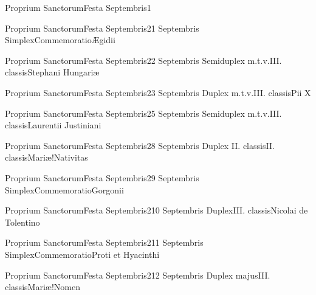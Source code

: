 \documentclass[liber-responsorialis_aestivus.tex]{subfiles}
\begin{document}
	{Proprium Sanctorum}{Festa Septembris}{1}{}
	{}{}{}{}{}

	{Proprium Sanctorum}{Festa Septembris}{2}{1 Septembris}
	{Simplex}{Commemoratio}{Ægidii}
	{}
	{}
\rubric{\respdetemp}

	{Proprium Sanctorum}{Festa Septembris}{2}{2 Septembris}
	{Semiduplex m.t.v.}{III. classis}{Stephani Hungariæ}
	{\conprubric}
	{\respdetemp}

	{Proprium Sanctorum}{Festa Septembris}{2}{3 Septembris}
	{Duplex m.t.v.}{III. classis}{Pii X}
	{\coporubric}
	{\respdetemp}

	{Proprium Sanctorum}{Festa Septembris}{2}{5 Septembris}
	{Semiduplex m.t.v.}{III. classis}{Laurentii Justiniani}
	{\coporubric}
	{\respdetemp}

	{Proprium Sanctorum}{Festa Septembris}{2}{8 Septembris}
	{Duplex II. classis}{II. classis}{Mariæ!Nativitas}
	{}
	{}

	{Proprium Sanctorum}{Festa Septembris}{2}{9 Septembris}
	{Simplex}{Commemoratio}{Gorgonii}
	{}
	{}
\rubric{\respdetemp}

	{Proprium Sanctorum}{Festa Septembris}{2}{10 Septembris}
	{Duplex}{III. classis}{Nicolai de Tolentino}
	{\conprubric}
	{\respdetemp}

	{Proprium Sanctorum}{Festa Septembris}{2}{11 Septembris}
	{Simplex}{Commemoratio}{Proti et Hyacinthi}
	{}
	{}
\rubric{\respdetemp}

	{Proprium Sanctorum}{Festa Septembris}{2}{12 Septembris}
	{Duplex majus}{III. classis}{Mariæ!Nomen}
	{\cbmvrubric}
	{\respdetemp}
\end{document}
